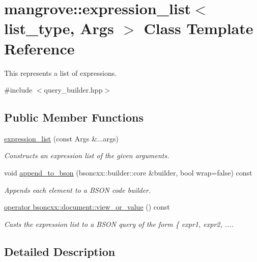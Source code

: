 \hypertarget{classmangrove_1_1expression__list}{}\section{mangrove\+:\+:expression\+\_\+list$<$ list\+\_\+type, Args $>$ Class Template Reference}
\label{classmangrove_1_1expression__list}


This represents a list of expressions.  




{\ttfamily \#include $<$query\+\_\+builder.\+hpp$>$}

\subsection*{Public Member Functions}
\begin{DoxyCompactItemize}
\item 
\hyperlink{classmangrove_1_1expression__list_afb6fc9622268f726efbb81c86a1228b0}{expression\+\_\+list} (const Args \&...args)
\begin{DoxyCompactList}\small\item\em Constructs an expression list of the given arguments. \end{DoxyCompactList}\item 
void \hyperlink{classmangrove_1_1expression__list_a2559853bc8b2aa890ee1f40b6271afb0}{append\+\_\+to\+\_\+bson} (bsoncxx\+::builder\+::core \&builder, bool wrap=false) const 
\begin{DoxyCompactList}\small\item\em Appends each element to a B\+S\+ON code builder. \end{DoxyCompactList}\item 
\hyperlink{classmangrove_1_1expression__list_a16c16dd815e8061aa8b32e9d71f8a3ff}{operator bsoncxx\+::document\+::view\+\_\+or\+\_\+value} () const 
\begin{DoxyCompactList}\small\item\em Casts the expression list to a B\+S\+ON query of the form \{ expr1, expr2, .... \end{DoxyCompactList}\end{DoxyCompactItemize}


\subsection{Detailed Description}
